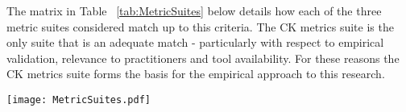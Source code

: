 The matrix in Table ~\ref{tab:MetricSuites} below details how each of the three metric suites considered match up to this criteria. The CK metrics suite is the only suite that is an adequate match - particularly with respect to empirical validation, relevance to practitioners and tool availability. For these reasons the CK metrics suite forms the basis for the empirical approach to this research. 

\begin{table}
\centering 
{}
\begin{tabular}
 \centering 
 \texttt{[image: MetricSuites.pdf]}
 \label{tab:MetricSuites}
\end{tabular}
\end{table}